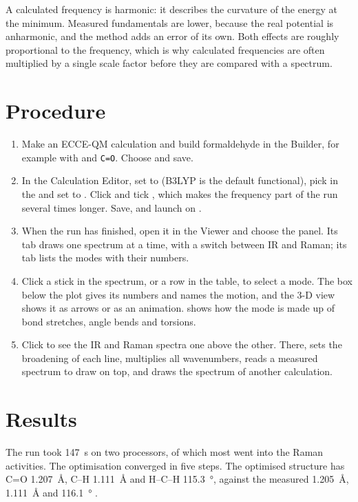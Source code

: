 A calculated frequency is harmonic: it describes the curvature of the energy at the minimum. Measured fundamentals are lower, because the real potential is anharmonic, and the method adds an error of its own. Both effects are roughly proportional to the frequency, which is why calculated frequencies are often multiplied by a single scale factor before they are compared with a spectrum.

\section{Procedure}
\begin{enumerate}
	\item Make an ECCE-QM calculation and build formaldehyde in the Builder, for example with  and \texttt{C=O}. Choose  and save.
	\item In the Calculation Editor, set  to  (B3LYP is the default functional), pick  in the  and set  to . Click  and tick , which makes the frequency part of the run several times longer. Save, and launch on .
	\item When the run has finished, open it in the Viewer and choose the  panel. Its  tab draws one spectrum at a time, with a switch between IR and Raman; its  tab lists the modes with their numbers.
	\item Click a stick in the spectrum, or a row in the table, to select a mode. The box below the plot gives its numbers and names the motion, and the 3-D view shows it as arrows or as an animation.  shows how the mode is made up of bond stretches, angle bends and torsions.
	\item Click  to see the IR and Raman spectra one above the other. There,  sets the broadening of each line,  multiplies all wavenumbers,  reads a measured spectrum to draw on top, and  draws the spectrum of another calculation.
\end{enumerate}

\section{Results}
The run took 147~s on two processors, of which most went into the Raman activities. The optimisation converged in five steps. The optimised structure has C=O \SI{1.207}{\angstrom}, C--H \SI{1.111}{\angstrom} and H--C--H \SI{115.3}{\degree}, against the measured \SI{1.205}{\angstrom}, \SI{1.111}{\angstrom} and \SI{116.1}{\degree} \cite{cccbdb}.

